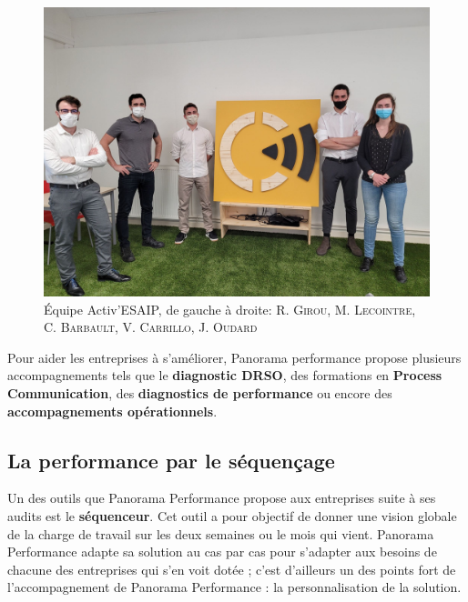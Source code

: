 \begin{figure}[!h]
    \centering
    \includegraphics[scale=0.15]{img/team.jpg}
    \caption{\centering Équipe Activ'ESAIP, de gauche à droite: R. \textsc{Girou}, M. \textsc{Lecointre}, C. \textsc{Barbault}, V. \textsc{Carrillo}, J. \textsc{Oudard}}
    \label{fig:Equipe Activ'ESAIP}
\end{figure}

Pour aider les entreprises à s'améliorer, Panorama performance propose plusieurs accompagnements tels que le \textbf{diagnostic DRSO}, des formations en \textbf{Process Communication}, des \textbf{diagnostics de performance} ou encore des \textbf{accompagnements opérationnels}.\\

\clearpage
\subsection{La performance par le séquençage}

Un des outils que Panorama Performance propose aux entreprises suite à ses audits est le \textbf{séquenceur}. Cet outil a pour objectif de donner une vision globale de la charge de travail sur les deux semaines ou le mois qui vient. Panorama Performance adapte sa solution au cas par cas pour s'adapter aux besoins de chacune des entreprises qui s'en voit dotée ; c'est d'ailleurs un des points fort de l'accompagnement de Panorama Performance : la personnalisation de la solution.

